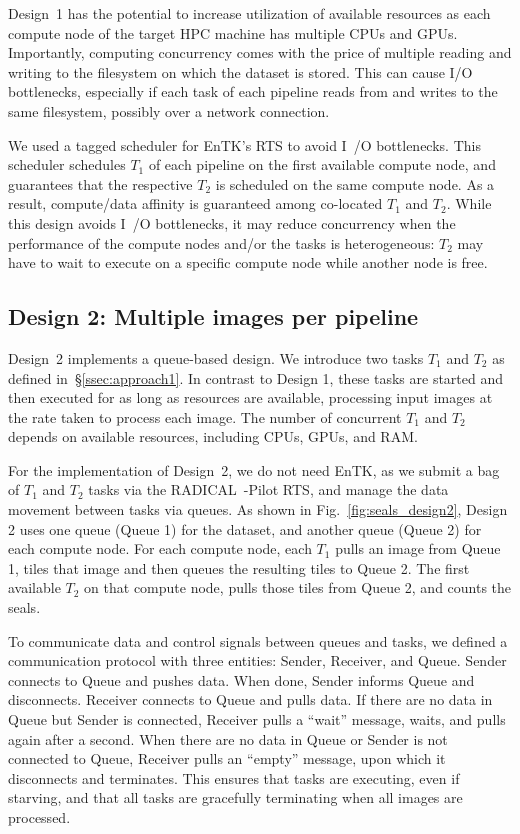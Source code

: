 Design~1 has the potential to increase utilization of available resources as each compute node of the target HPC machine has multiple CPUs and GPUs.
Importantly, computing concurrency comes with the price of multiple reading and writing to the filesystem on which the dataset is stored.
This can cause I/O bottlenecks, especially if each task of each pipeline reads from and writes to the same filesystem, possibly over a network connection.

We used a tagged scheduler for EnTK's RTS to avoid I~/O bottlenecks.
This scheduler schedules $T_{1}$ of each pipeline on the first available compute node, and guarantees that the respective $T_{2}$ is scheduled on the same compute node.
As a result, compute/data affinity is guaranteed among co-located $T_{1}$ and $T_{2}$.
While this design avoids I~/O bottlenecks, it may reduce concurrency when the performance of the compute nodes and/or the tasks is heterogeneous: $T_{2}$ may have to wait to execute on a specific compute node while another node is free.


\subsection{Design 2: Multiple images per pipeline}\label{ssec:approach2}

Design~2 implements a queue-based design.
We introduce two tasks $T_{1}$ and $T_{2}$ as defined in~\S\ref{ssec:approach1}.
In contrast to Design 1, these tasks are started and then executed for as long as resources are available, processing input images at the rate taken to process each image.
The number of concurrent $T_{1}$ and $T_{2}$ depends on available resources, including CPUs, GPUs, and RAM.

For the implementation of Design~2, we do not need EnTK, as we submit a bag of $T_{1}$ and $T_{2}$ tasks via the RADICAL~-Pilot RTS, and manage the data movement between tasks via queues.
As shown in Fig.~\ref{fig:seals_design2}, Design 2 uses one queue (Queue 1) for the dataset, and another queue (Queue 2) for each compute node.
For each compute node, each $T_{1}$ pulls an image from Queue 1, tiles that image and then queues the resulting tiles to Queue 2.
The first available $T_{2}$ on that compute node, pulls those tiles from Queue 2, and counts the seals.

To communicate data and control signals between queues and tasks, we defined a communication protocol with three entities: Sender, Receiver, and Queue. 
Sender connects to Queue and pushes data.
When done, Sender informs Queue and disconnects.
Receiver connects to Queue and pulls data.
If there are no data in Queue but Sender is connected, Receiver pulls a ``wait'' message, waits, and pulls again after a second.
When there are no data in Queue or Sender is not connected to Queue, Receiver pulls an ``empty'' message, upon which it disconnects and terminates.
This ensures that tasks are executing, even if starving, and that all tasks are gracefully terminating when all images are processed.

